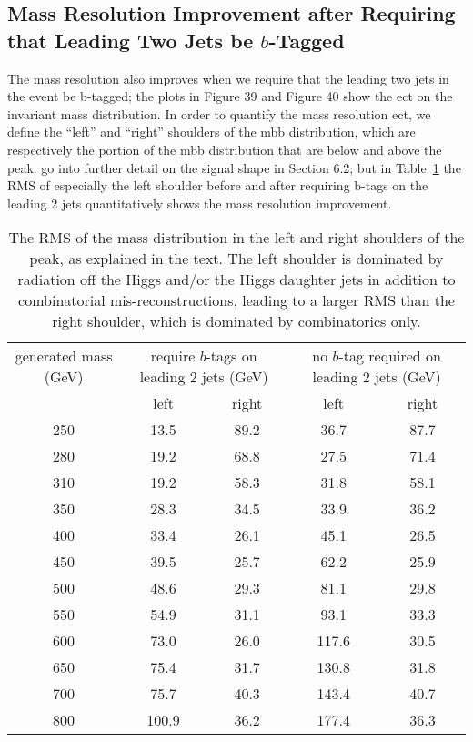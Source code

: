 \subsection{Mass Resolution Improvement after Requiring that Leading Two Jets be $b$-Tagged}
The mass resolution also improves when we require that the leading two jets in the event be b-tagged;
 the plots in Figure 39 and Figure 40 show the ect on the invariant mass distribution.
 In order to quantify the mass resolution ect, we define the “left” and “right” shoulders of the mbb
 distribution, which are respectively the portion of the mbb distribution that are below and above the peak.
 go into further detail on the signal shape in Section 6.2; but in Table~\ref{tab:signal_mass_RMS_compare} the RMS of especially the left
 shoulder before and after requiring b-tags on the leading 2 jets quantitatively shows the mass resolution
 improvement.



\begin{table}
\centering
\caption{The RMS of the mass distribution in the left and right shoulders of the peak,
    as explained in the text.  The left shoulder is dominated by radiation off the Higgs
    and/or the Higgs daughter jets in addition to combinatorial mis-reconstructions,
    leading to a larger RMS than the right shoulder, which
    is dominated by combinatorics only.\label{tab:signal_mass_RMS_compare}   }
  \begin{tabular}{ccccc}
     \hline \hline
     generated mass (GeV) & \multicolumn{2}{c}{require $b$-tags on leading 2 jets (GeV)} & \multicolumn{2}{c}{no $b$-tag required on leading 2 jets (GeV)}  \\
        & left & right & left & right \\ \hline
     250 & 13.5 & 89.2 & 36.7 & 87.7 \\
     280 & 19.2 & 68.8 & 27.5 & 71.4 \\
     310 & 19.2 & 58.3 & 31.8 & 58.1 \\
     350 & 28.3 & 34.5 & 33.9 & 36.2 \\
     400 & 33.4 & 26.1 & 45.1 & 26.5 \\
     450 & 39.5 & 25.7 & 62.2 & 25.9 \\
     500 & 48.6 & 29.3 & 81.1 & 29.8 \\
     550 & 54.9 & 31.1 & 93.1 & 33.3 \\
     600 & 73.0 & 26.0 & 117.6 & 30.5 \\
     650 & 75.4 & 31.7 & 130.8 & 31.8 \\
     700 & 75.7 & 40.3 & 143.4 & 40.7 \\
     800 & 100.9 & 36.2 & 177.4 & 36.3 \\
     \hline     \end{tabular}
\end{table}


